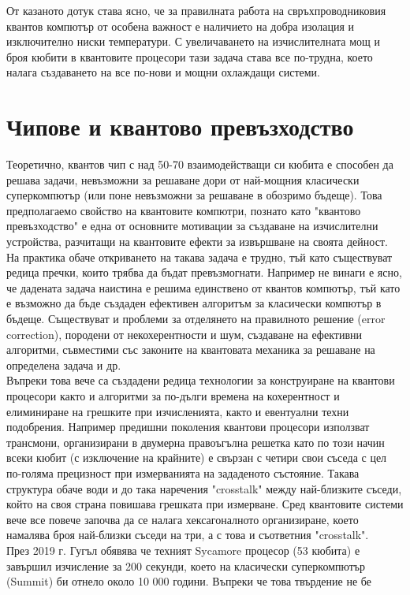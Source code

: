     От казаното дотук става ясно, че за правилната работа на свръхпроводниковия квантов компютър от особена важност е наличието на добра изолация и изключително ниски температури. С увеличаването на изчислителната мощ и броя
    кюбити в квантовите процесори тази задача става все по-трудна, което налага създаването на все по-нови и мощни охлаждащи системи.

    \section{Чипове и квантово превъзходство}

    Теоретично, квантов чип с над 50-70 взаимодействащи си кюбита е способен да решава задачи, невъзможни за решаване дори от най-мощния класически суперкомпютър (или поне невъзможни за решаване в обозримо бъдеще).
    Това предполагаемо свойство на квантовите компютри, познато като "квантово превъзходство" е една от основните мотивации за създаване на изчислителни устройства, разчитащи на квантовите ефекти за извършване на
    своята дейност. На практика обаче откриването на такава задача е трудно, тъй като съществуват редица пречки, които трябва да бъдат превъзмогнати. Например не винаги е ясно, че дадената задача наистина е решима
    единствено от квантов компютър, тъй като е възможно да бъде създаден ефективен алгоритъм за класически компютър в бъдеще. Съществуват и проблеми за отделянето на правилното решение (error correction), породени от
    некохерентности и шум, създаване на ефективни алгоритми, съвместими със законите на квантовата механика за решаване на определена задача и др.\\
    Въпреки това вече са създадени редица технологии за конструиране на квантови процесори както и алгоритми за по-дълги времена на кохерентност и елиминиране на грешките при изчисленията, както и евентуални техни подобрения.
    Например предишни поколения квантови процесори използват трансмони, организирани в двумерна правоъгълна решетка като по този начин всеки кюбит (с изключение на крайните) е свързан с четири свои съседа с цел по-голяма
    прецизност при измерванията на зададеното състояние. Такава структура обаче води и до така наречения "crosstalk" между най-близките съседи, който на своя страна повишава грешката при измерване. Сред квантовите системи вече
    все повече започва да се налага хексагоналното организиране, което намалява броя най-близки съседи на три, а с това и съответния "crosstalk".\\
    През 2019 г. Гугъл обявява че техният Sycamore процесор (53 кюбита) е завършил изчисление за 200 секунди, което на класически суперкомпютър (Summit) би отнело около 10 000 години. Въпреки че това твърдение не бе
